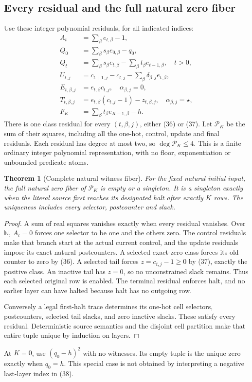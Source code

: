 \documentclass[11pt,a4paper]{article}
\numberwithin{equation}{section}
\newtheorem{theorem}{Theorem}[section]
\newcommand{\N}{\mathbb N}\newcommand{\Z}{\mathbb Z}\newcommand{\R}{\mathbb R}
\begin{document}
\subsection{Every residual and the full natural zero fiber}
Use these integer polynomial residuals, for all indicated indices:
\begin{align}
 A_t&=\sum_\beta e_{t,\beta}-1,                         \tag{32}\\
 Q_0&=\sum_\beta s_\beta e_{0,\beta}-q_0,              \tag{33}\\
 Q_t&=\sum_\beta s_\beta e_{t,\beta}
             -\sum_\beta t_\beta e_{t-1,\beta},\quad t>0,\tag{34}\\
 U_{t,j}&=c_{t+1,j}-c_{t,j}-\sum_\beta\delta_{\beta,j}e_{t,\beta},\tag{35}\\
 E_{t,\beta,j}&=e_{t,\beta}c_{t,j},\quad\alpha_{\beta,j}=0,\tag{36}\\
 T_{t,\beta,j}&=e_{t,\beta}(c_{t,j}-1)-z_{t,\beta,j},
                                  \quad\alpha_{\beta,j}=\star,\tag{37}\\
 F_K&=\sum_\beta t_\beta e_{K-1,\beta}-h.             \tag{38}
\end{align}
There is one class residual for every $(t,\beta,j)$, either (36) or (37).
Let $\mathcal P_K$ be the sum of their squares, including all the one-hot,
control, update and final residuals. Each residual has degree at most two,
so $\deg\mathcal P_K\le4$. This is a finite ordinary integer polynomial
representation, with no floor, exponentiation or unbounded predicate atoms.

\begin{theorem}[Complete natural witness fiber]\label{fpa:ls:thm:quartic}
For the fixed natural initial input, the full natural zero fiber of
$\mathcal P_K$ is empty or a singleton. It is a singleton exactly when the
literal source first reaches its designated halt after exactly $K$ rows.
The uniqueness includes every selector, postcounter and slack.
\end{theorem}
\begin{proof}
A sum of real squares vanishes exactly when every residual vanishes. Over
$\N$, $A_t=0$ forces one selector to be one and the others zero. The control
residuals make that branch start at the actual current control, and the update
residuals impose its exact natural postcounters. A selected exact-zero class
forces its old counter to zero by (36). A selected tail forces
$z=c_{t,j}-1\ge0$ by (37), exactly the positive class. An inactive tail has
$z=0$, so no unconstrained slack remains. Thus each selected original row is
enabled. The terminal residual enforces halt, and no earlier layer can have
halted because halt has no outgoing row.

Conversely a legal first-halt trace determines its one-hot cell selectors,
postcounters, selected tail slacks, and zero inactive slacks. These satisfy
every residual. Deterministic source semantics and the disjoint cell partition
make that entire tuple unique by induction on layers.
\end{proof}
At $K=0$, use $(q_0-h)^2$ with no witnesses. Its empty tuple is the unique
zero exactly when $q_0=h$. This special case is not obtained by interpreting
a negative last-layer index in (38).
\end{document}
